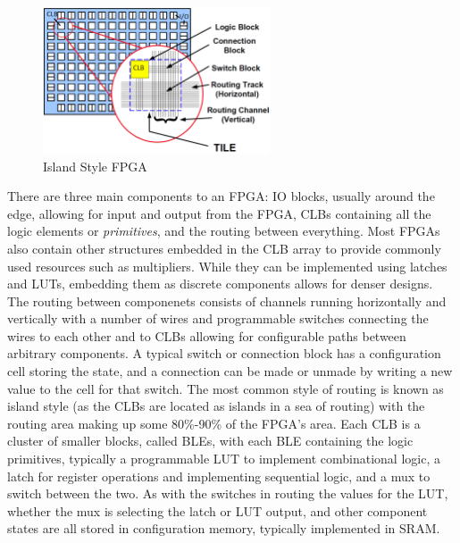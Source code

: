 \documentclass[12pt,final,oneside]{dwThesis} %
\begin{document}
\begin{figure}
    \begin{center}
        \includegraphics[width=0.6\textwidth]{images/fpga-arch.png}
        \caption{Island Style FPGA\cite{WiltonLecture}}
        \label{FPGAArch}
    \end{center}
\end{figure}

There are three main components to an \ac{FPGA}: \ac{IO} blocks, usually around the edge, allowing for input and output from the \ac{FPGA}, \acp{CLB} containing all the logic elements or \emph{primitives}, and the routing between everything.
Most \acp{FPGA} also contain other structures embedded in the \ac{CLB} array to provide commonly used resources such as multipliers. While they can be implemented using latches and \acp{LUT}, embedding them as discrete components allows for denser designs.
The routing between componenets consists of channels running horizontally and vertically with a number of wires and programmable switches connecting the wires to each other and to \acp{CLB} allowing for configurable paths between arbitrary components. A typical switch or connection block has a configuration cell storing the state, and a connection can be made or unmade by writing a new value to the cell for that switch. The most common style of routing is known as island style (as the \acp{CLB} are located as islands in a sea of routing) with the routing area making up some 80\%-90\% of the \ac{FPGA}'s area\cite{FPGAArch}.
Each \ac{CLB} is a cluster of smaller blocks, called \acp{BLE}, with each \ac{BLE} containing the logic primitives, typically a programmable \ac{LUT} to implement combinational logic, a latch for register operations and implementing sequential logic, and a \ac{mux} to switch between the two. As with the switches in routing the values for the \ac{LUT}, whether the \ac{mux} is selecting the latch or \ac{LUT} output, and other component states are all stored in configuration memory, typically implemented in \acs{SRAM}.
\end{document}
